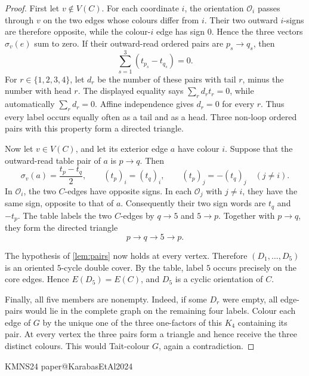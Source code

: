 \documentclass[justified,notoc,twoside,nobib,nofonts]{tufte-handout}
\makeatletter
\newcommand{\paperreference}[1]{\csname paper@#1\endcsname}
\makeatother
\begin{document}
\begin{proof}
First let \(v\notin V(C)\).  For each coordinate \(i\), the orientation
\(\mathcal O_i\) passes through \(v\) on the two edges whose colours differ
from \(i\).  Their two outward \(i\)-signs are therefore opposite, while the
colour-\(i\) edge has sign \(0\).  Hence the three vectors \(\sigma_v(e)\)
sum to zero.  If their outward-read ordered pairs are
\(p_s\to q_s\), then
\[
 \sum_{s=1}^3(t_{p_s}-t_{q_s})=0.
\]
For \(r\in\{1,2,3,4\}\), let \(d_r\) be the number of these pairs with tail
\(r\), minus the number with head \(r\).  The displayed equality says
\(\sum_r d_rt_r=0\), while automatically \(\sum_r d_r=0\).  Affine
independence gives \(d_r=0\) for every \(r\).  Thus every label occurs
equally often as a tail and as a head.  Three non-loop ordered pairs with
this property form a directed triangle.

Now let \(v\in V(C)\), and let its exterior edge \(a\) have colour \(i\).
Suppose that the outward-read table pair of \(a\) is \(p\to q\).  Then
\[
 \sigma_v(a)=\frac{t_p-t_q}{2},\qquad
 (t_p)_i=(t_q)_i,\qquad
 (t_p)_j=-(t_q)_j\quad(j\ne i).
\]
In \(\mathcal O_i\), the two \(C\)-edges have opposite signs.  In each
\(\mathcal O_j\) with \(j\ne i\), they have the same sign, opposite to that
of \(a\).  Consequently their two sign words are \(t_q\) and \(-t_p\).
The table labels the two \(C\)-edges by \(q\to5\) and \(5\to p\).
Together with \(p\to q\), they form the directed triangle
\[
 p\longrightarrow q\longrightarrow5\longrightarrow p.
\]

The hypothesis of \cref{lem:pairs} now holds at every vertex.  Therefore
\((D_1,\ldots,D_5)\) is an oriented \(5\)-cycle double cover.  By the
table, label \(5\) occurs precisely on the core edges.  Hence
\(E(D_5)=E(C)\), and \(D_5\) is a cyclic orientation of \(C\).

Finally, all five members are nonempty.  Indeed, if some \(D_r\) were
empty, all edge-pairs would lie in the complete graph on the remaining
four labels.  Colour each edge of \(G\) by the unique one of the three
one-factors of this \(K_4\) containing its pair.  At every vertex the
three pairs form a triangle and hence receive the three distinct colours.
This would Tait-colour \(G\), again a contradiction.
\end{proof}

\begingroup
\fontsize{10}{12}\selectfont
\setlength{\bibsep}{5pt}
\begin{thebibliography}{KMNS24}
\paperreference{KarabasEtAl2024}
\end{thebibliography}
\endgroup
\end{document}
